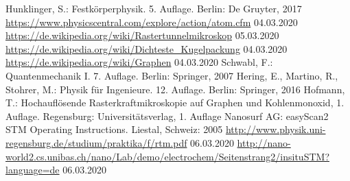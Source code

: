 \begin{thebibliography}{xxx}
        Hunklinger, S.: Festkörperphysik. 5. Auflage. Berlin: De Gruyter, 2017
        \url{https://www.physicscentral.com/explore/action/atom.cfm}
        04.03.2020
        \url{https://de.wikipedia.org/wiki/Rastertunnelmikroskop}
        05.03.2020
        \url{https://de.wikipedia.org/wiki/Dichteste_Kugelpackung}
        04.03.2020
        \url{https://de.wikipedia.org/wiki/Graphen}
        04.03.2020
        Schwabl, F.: Quantenmechanik I. 7. Auflage. Berlin: Springer, 2007
        Hering, E., Martino, R., Stohrer, M.: Physik für Ingenieure. 12. Auflage.
        Berlin: Springer, 2016
        Hofmann, T.: Hochauflösende Rasterkraftmikroskopie auf Graphen und 
        Kohlenmonoxid, 1. Auflage. Regensburg: Universitätsverlag, 1. Auflage
        Nanosurf AG: easyScan2 STM Operating Instructions. Liestal, Schweiz: 2005
        \url{http://www.physik.uni-regensburg.de/studium/praktika/f/rtm.pdf}
        06.03.2020
        \url{http://nano-world2.cs.unibas.ch/nano/Lab/demo/electrochem/Seitenstrang2/insituSTM?language=de}
        06.03.2020
\end{thebibliography}
 
